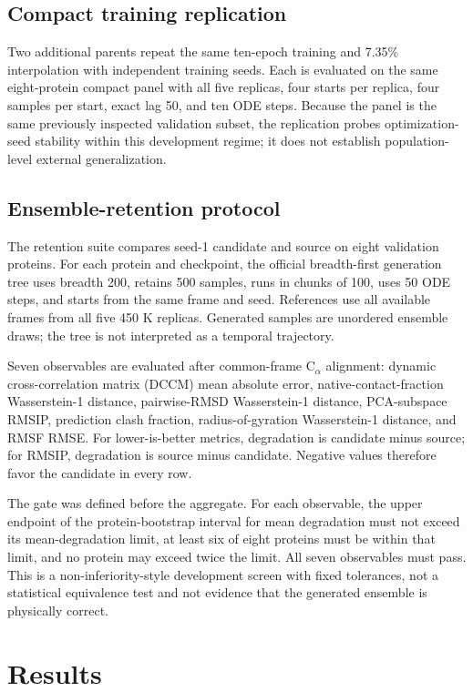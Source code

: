 \documentclass{article}
\newcommand{\CA}{C$_\alpha$}
\begin{document}
\subsection{Compact training replication}

Two additional parents repeat the same ten-epoch training and 7.35\% interpolation with independent training seeds. Each is evaluated on the same eight-protein compact panel with all five replicas, four starts per replica, four samples per start, exact lag 50, and ten ODE steps. Because the panel is the same previously inspected validation subset, the replication probes optimization-seed stability within this development regime; it does not establish population-level external generalization.

\subsection{Ensemble-retention protocol}

The retention suite compares seed-1 candidate and source on eight validation proteins. For each protein and checkpoint, the official breadth-first generation tree uses breadth 200, retains 500 samples, runs in chunks of 100, uses 50 ODE steps, and starts from the same frame and seed. References use all available frames from all five 450 K replicas. Generated samples are unordered ensemble draws; the tree is not interpreted as a temporal trajectory.

Seven observables are evaluated after common-frame \CA{} alignment: dynamic cross-correlation matrix (DCCM) mean absolute error, native-contact-fraction Wasserstein-1 distance, pairwise-RMSD Wasserstein-1 distance, PCA-subspace RMSIP, prediction clash fraction, radius-of-gyration Wasserstein-1 distance, and RMSF RMSE. For lower-is-better metrics, degradation is candidate minus source; for RMSIP, degradation is source minus candidate. Negative values therefore favor the candidate in every row.

The gate was defined before the aggregate. For each observable, the upper endpoint of the protein-bootstrap interval for mean degradation must not exceed its mean-degradation limit, at least six of eight proteins must be within that limit, and no protein may exceed twice the limit. All seven observables must pass. This is a non-inferiority-style development screen with fixed tolerances, not a statistical equivalence test and not evidence that the generated ensemble is physically correct.

\section{Results}
\end{document}
